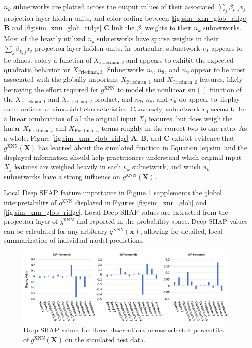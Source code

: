 \documentclass[information,article,submit,moreauthors,pdftex]{definitions/mdpi}
\begin{document}
\noindent $n_k$ subnetworks are plotted across the output values of their associated $\sum_j\beta_{k,j}x_j$ projection layer hidden units, and color-coding between \ref{fig:sim_xnn_glob_ridge} \textbf{B} and \ref{fig:sim_xnn_glob_ridge} \textbf{C} link the $\beta_j$ weights to their $n_k$ subnetworks. Most of the heavily utilized $n_k$ subnetworks have sparse weights in their $\sum_j\beta_{k,j}x_j$ projection layer hidden units. In particular, subnetwork $n_1$ appears to be almost solely a function of $X_{\text{Friedman}, 3}$ and appears to exhibit the expected quadratic behavior for $X_{\text{Friedman}, 3}$.  Subnetworks $n_7$, $n_8$, and $n_9$ appear to be most associated with the globally important $X_{\text{Friedman}, 1}$ and $X_{\text{Friedman}, 2}$ features, likely betraying the effort required for $g^{\text{XNN}}$ to model the nonlinear $\text{sin}()$ function of the $X_{\text{Friedman}, 1}$ and $X_{\text{Friedman}, 2}$ product, and $n_7$, $n_8$, and $n_9$ do appear to display some noticeable sinusoidal characteristics.  Conversely, subnetwork $n_4$ seems to be a linear combination of all the original input $X_j$ features, but does weigh the linear $X_{\text{Friedman},4}$ and $X_{\text{Friedman},5}$ terms roughly in the correct two-to-one ratio. As a whole, Figure \ref{fig:sim_xnn_glob_ridge} \textbf{A}, \textbf{B}, and \textbf{C} exhibit evidence that $g^\text{XNN}(\mathbf{X})$ has learned about the simulated function in Equation \ref{eq:sim} and the displayed information should help practitioners understand which original input $X_j$ features are weighed heavily in each $n_k$ subnetwork, and which $n_k$ subnetworks have a strong influence on $g^\text{XNN}(\mathbf{X})$. 

Local Deep SHAP feature importance in Figure \ref{fig:sim_xnn_loc} supplements the global interpretability of $g^\text{XNN}$ displayed in Figures \ref{fig:sim_xnn_glob} and \ref{fig:sim_xnn_glob_ridge}. Local Deep SHAP values are extracted from the projection layer of $g^\text{XNN}$ and reported in the probability space. Deep SHAP values can be calculated for any arbitrary $g^\text{XNN}(\mathbf{x})$, allowing for detailed, local summarization of individual model predictions. 

\begin{figure}[H]
	\centering
	\includegraphics[width=15cm]{img/sim_xnn_loc.png}
	\caption{Deep SHAP values for three observations across selected percentiles of $g^\text{XNN}(\mathbf{X})$ on the simulated test data.}
	\label{fig:sim_xnn_loc}
\end{figure}  
\end{document}

